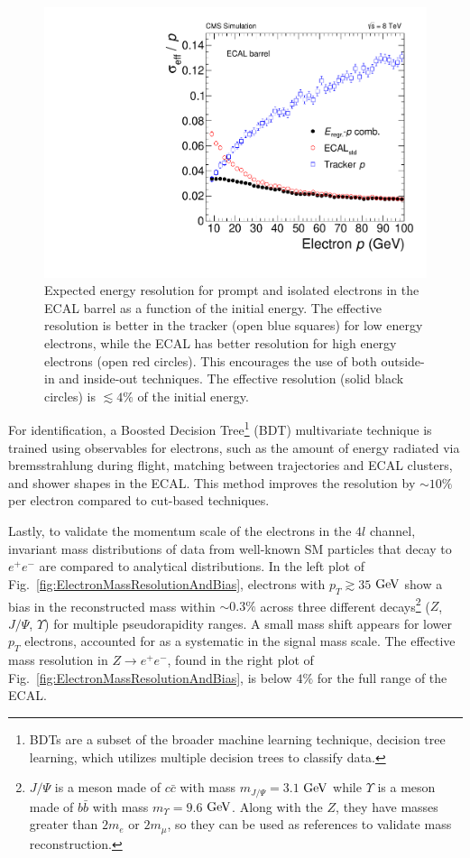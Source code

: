 \begin{figure}[htbp]
\begin{center}
\includegraphics[width=.6\linewidth]{HiggsDiscovery/figures/effRMSbarrel_withregression_new.pdf}
\caption[Expected Energy Resolution for Electrons]{Expected energy resolution for prompt and isolated electrons in the ECAL barrel as a function of the initial energy. The effective resolution is better in the tracker (open blue squares) for low energy electrons, while the ECAL has better resolution for high energy electrons (open red circles). This encourages the use of both outside-in and inside-out techniques. The effective resolution (solid black circles) is $\lesssim 4\%$ of the initial energy. }
\label{fig:ElectronEnergyResolution}
\end{center}
\end{figure}

For identification, a Boosted Decision Tree\footnote{BDTs are a subset of the broader machine learning technique, decision tree learning, which utilizes multiple decision trees to classify data.} (BDT) multivariate technique \cite{} is trained using observables for electrons, such as the amount of energy radiated via bremsstrahlung during flight, matching between trajectories and ECAL clusters, and shower shapes in the ECAL. This method improves the resolution by $\sim 10\%$ per electron compared to cut-based techniques.

Lastly, to validate the momentum scale of the electrons in the $4l$ channel, invariant mass distributions of data from well-known SM particles that decay to $e^+e^-$ are compared to analytical distributions. In the left plot of Fig.~\ref{fig:ElectronMassResolutionAndBias}, electrons with $p_T\gtrsim35$ $\rm{GeV}$ show a bias in the reconstructed mass within $\sim0.3\%$ across three different decays\footnote{$J/\Psi$ is a meson made of $c\bar{c}$ with mass $m_{J/\Psi}=3.1$ $\rm{GeV}$ while $\Upsilon$ is a meson made of $b\bar{b}$ with mass $m_{\Upsilon}=9.6$ $\rm{GeV}$. Along with the $Z$, they have masses greater than $2m_e$ or $2m_\mu$, so they can be used as references to validate mass reconstruction.} ($Z$, $J/\Psi$, $\Upsilon$) for multiple pseudorapidity ranges. A small mass shift appears for lower $p_T$ electrons, accounted for as a systematic in the signal mass scale. The effective mass resolution in $Z\rightarrow e^+e^-$, found in  the right plot of Fig.~\ref{fig:ElectronMassResolutionAndBias}, is below $4\%$ for the full range of the ECAL.

